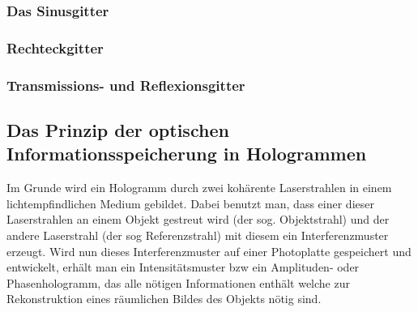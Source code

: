 \subsubsection{Das Sinusgitter}

\subsubsection{Rechteckgitter}

\subsubsection{Transmissions- und Reflexionsgitter}

\subsection{Das Prinzip der optischen 
Informationsspeicherung in Hologrammen}
Im Grunde wird ein Hologramm durch zwei kohärente Laserstrahlen in einem lichtempfindlichen Medium gebildet. Dabei benutzt man, dass einer dieser Laserstrahlen an einem Objekt gestreut wird (der sog. Objektstrahl) und der andere Laserstrahl (der sog Referenzstrahl) mit diesem ein Interferenzmuster erzeugt.
Wird nun dieses Interferenzmuster auf einer Photoplatte gespeichert und entwickelt, erhält man ein Intensitätsmuster bzw ein Amplituden- oder Phasenhologramm, das alle nötigen Informationen enthält welche zur Rekonstruktion eines räumlichen Bildes des Objekts nötig sind.

\newpage
